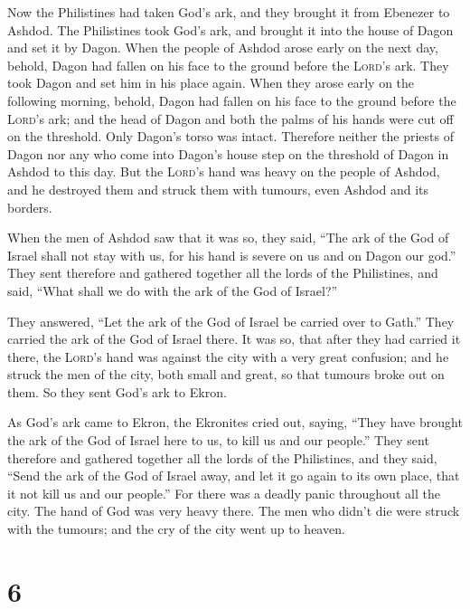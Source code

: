  Now the Philistines had taken God's ark, and they brought
it from Ebenezer to Ashdod.  The Philistines took God's
ark, and brought it into the house of Dagon and set it by Dagon.
 When the people of Ashdod arose early on the next day,
behold, Dagon had fallen on his face to the ground before the
\textsc{Lord}'s ark. They took Dagon and set him in his place again.
 When they arose early on the following morning, behold,
Dagon had fallen on his face to the ground before the \textsc{Lord}'s
ark; and the head of Dagon and both the palms of his hands were cut off
on the threshold. Only Dagon's torso was intact. 
Therefore neither the priests of Dagon nor any who come into Dagon's
house step on the threshold of Dagon in Ashdod to this day.
 But the \textsc{Lord}'s hand was heavy on the people of
Ashdod, and he destroyed them and struck them with tumours, even Ashdod
and its borders.

 When the men of Ashdod saw that it was so, they said,
``The ark of the God of Israel shall not stay with us, for his hand is
severe on us and on Dagon our god.''  They sent therefore
and gathered together all the lords of the Philistines, and said, ``What
shall we do with the ark of the God of Israel?''

They answered, ``Let the ark of the God of Israel be carried over to
Gath.'' They carried the ark of the God of Israel there. 
It was so, that after they had carried it there, the \textsc{Lord}'s
hand was against the city with a very great confusion; and he struck the
men of the city, both small and great, so that tumours broke out on
them.  So they sent God's ark to Ekron.

As God's ark came to Ekron, the Ekronites cried out, saying, ``They have
brought the ark of the God of Israel here to us, to kill us and our
people.''  They sent therefore and gathered together all
the lords of the Philistines, and they said, ``Send the ark of the God
of Israel away, and let it go again to its own place, that it not kill
us and our people.'' For there was a deadly panic throughout all the
city. The hand of God was very heavy there.  The men who
didn't die were struck with the tumours; and the cry of the city went up
to heaven.

\hypertarget{section-5}{%
\section{6}\label{section-5}}

